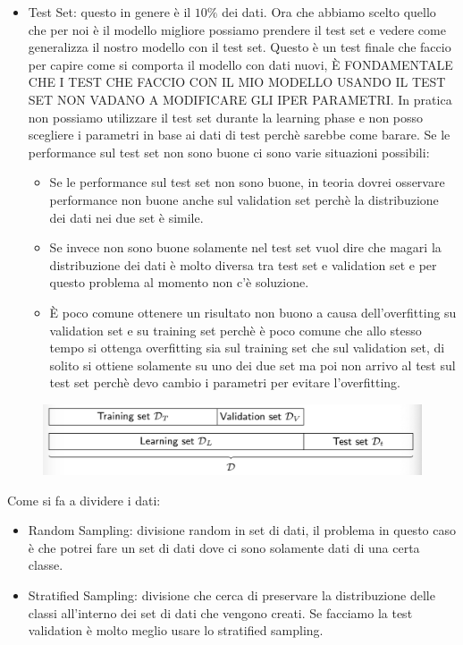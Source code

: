 \documentclass[14pt]{extreport}
\begin{document}
\begin{itemize}
\begin{itemize}
	      \end{itemize}
	\item Test Set: questo in genere è il $10\%$ dei dati. Ora che abbiamo scelto quello che per noi è il modello migliore possiamo prendere il test
	      set e vedere come generalizza il nostro modello con il test set. Questo è un test finale che faccio per capire come si comporta il modello
	      con dati nuovi, È FONDAMENTALE CHE I TEST CHE FACCIO CON IL MIO MODELLO USANDO IL TEST SET NON VADANO A MODIFICARE GLI IPER PARAMETRI. In
	      pratica non possiamo utilizzare il test set durante la learning phase e non posso scegliere i parametri in base ai dati di test perchè
	      sarebbe come barare. Se le performance sul test set non sono buone ci sono varie situazioni possibili:
	      \begin{itemize}
		      \item Se le performance sul test set non sono buone, in teoria dovrei osservare performance non buone anche sul validation set perchè la
		      distribuzione dei dati nei due set è simile.
		      \item Se invece non sono buone solamente nel test set vuol dire che magari la distribuzione dei dati è molto diversa tra test set e
		      validation set e per questo problema al momento non c’è soluzione.
		      \item È poco comune ottenere un risultato non buono a causa dell’overfitting su validation set e su training set perchè è poco comune
		      che allo stesso tempo si ottenga overfitting sia sul training set che sul validation set, di solito si ottiene solamente su uno dei due
		      set ma poi non arrivo al test sul test set perchè devo cambio i parametri per evitare l’overfitting.
	      \end{itemize}
\end{itemize}


\begin{figure}[H]
	\centering
	\includegraphics[width=0.7\linewidth]{455.jpeg}
\end{figure}

Come si fa a dividere i dati:
\begin{itemize}
	\item Random Sampling: divisione random in set di dati, il problema in questo caso è che potrei fare un set di dati dove ci sono solamente dati di
	una certa classe.
	\item Stratified Sampling: divisione che cerca di preservare la distribuzione delle classi all’interno dei set di dati che vengono creati. Se
	      facciamo la test validation è molto meglio usare lo stratified sampling.
\end{itemize}
\end{document}
